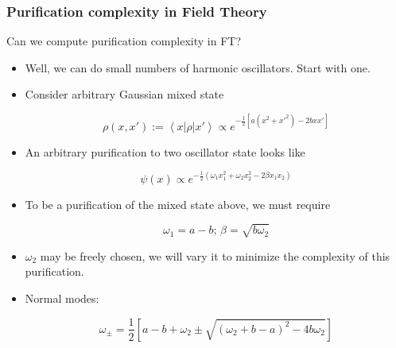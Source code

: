 \documentclass[10pt,aspectratio=169]{beamer}
\newcommand{\bra}[1]{\left< #1 \right|}
\newcommand{\ket}[1]{\left| #1 \right>}
\begin{document}
\begin{frame}
\frametitle{Purification complexity in Field Theory}

Can we compute purification complexity in FT?

\begin{itemize}

\item Well, we can do small numbers of harmonic oscillators. Start with one.

\item Consider arbitrary Gaussian mixed state

$$\rho(x,x') := \bra{x} \rho \ket{x'} \propto e^{-\frac{1}{2}[a (x^2 + x'^2) - 2 b x x']}$$

\item An arbitrary purification to two oscillator state looks like

$$\psi(x) \propto e^{-\frac{1}{2} (\omega_1 x_1^2 + \omega_2 x_2^2 - 2\beta x_1 x_2)}$$

\item To be a purification of the mixed state above, we must require

$$\omega_1 = a - b \text{; } \beta = \sqrt{b \omega_2}$$

\item $\omega_2$ may be freely chosen, we will vary it to minimize the complexity of this purification.

\item Normal modes:

$$\omega_{\pm} = \frac{1}{2} \left[a-b + \omega_2 \pm \sqrt{\left( \omega_2 + b - a \right)^2  - 4 b \omega_2} \right]$$

\end{itemize}

\end{frame}
\end{document}
